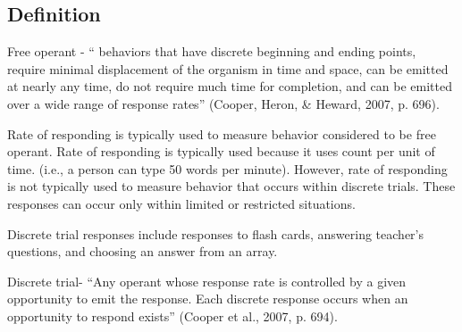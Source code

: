 \subsection{Definition} 
Free operant - `` behaviors that have discrete beginning and ending points, require minimal displacement of the organism in time and space, can be emitted at nearly any time, do not require much time for completion, and can be emitted over a wide range of response rates'' (Cooper, Heron, \& Heward, 2007, p. 696).

Rate of responding is typically used to measure behavior considered to be free operant. Rate of responding is typically used because it uses count per unit of time. (i.e., a person can type 50 words per minute). However, rate of responding is not typically used to measure behavior that occurs within discrete trials. These responses can occur only within limited or restricted situations. 

Discrete trial responses include responses to flash cards, answering teacher's questions, and choosing an answer from an array. 

Discrete trial- ``Any operant whose response rate is controlled by a given opportunity to emit the response. Each discrete response occurs when an opportunity to respond exists'' (Cooper et al., 2007, p. 694).

